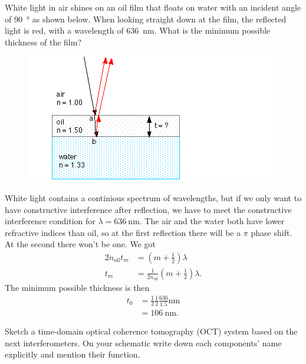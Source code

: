 \documentclass[answers, addpoints]{exam} %
\begin{document}
\begin{questions}
\question[10] White light in air shines on an oil film that floats on water with an incident angle of \SI{90}{\degree} as shown below.
When looking straight down at the film, the reflected light is red, with a wavelength of \SI{636}{\nano\meter}.
What is the minimum possible thickness of the film?
\begin{figure}[H]
	\centering
	\includegraphics[scale=1]{figures/oilfilm}
\end{figure}
\begin{solution}
	White light contains a continious spectrum of wavelengths, but if we only want to have constructive interference after reflection, we have to meet the constructive interference condition for $\lambda=\SI{636}{\nano\meter}$.
	The air and the water both have lower refractive indices than oil, so at the first reflection there will be a $\pi$ phase shift.
	At the second there won't be one.
	We got
	\begin{align*}
		2 n_{\mathrm{oil}} t_m &= \left(m+\frac{1}{2}\right)\lambda \\
		t_m &= \frac{1}{2n_{\mathrm{oil}}}\left(m+\frac{1}{2}\right)\lambda.
	\end{align*}
	The minimum possible thickness is then
	\begin{align*}
		t_0 &= \frac{1}{2}\frac{1}{2}\frac{636}{1.5}\si{\nano\meter} \\
		&= \SI{106}{\nano\meter}.
	\end{align*}
\end{solution}

\question[15] Sketch a time-domain optical coherence tomography (OCT) system based on the next interferometers.
On your schematic write down each components' name explicitly and mention their function.
\begin{parts}

\end{parts}
\end{questions}
\end{document}
